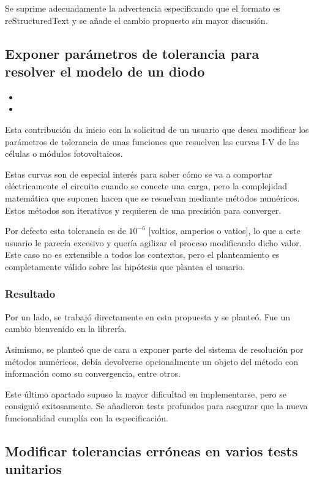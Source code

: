 Se suprime adecuadamente la advertencia especificando que el formato es reStructuredText y se añade el cambio propuesto sin mayor discusión.

\subsection{Exponer parámetros de tolerancia para resolver el modelo de un diodo}

\begin{itemize}
    \item {}
    \item {}
\end{itemize}

Esta contribución da inicio con la solicitud de un usuario que desea modificar los parámetros de tolerancia de unas funciones que resuelven las curvas I-V de las células o módulos fotovoltaicos.

Estas curvas son de especial interés para saber cómo se va a comportar eléctricamente el circuito cuando se conecte una carga, pero la complejidad matemática que suponen hacen que se resuelvan mediante métodos numéricos. Estos métodos son iterativos y requieren de una precisión para converger.

Por defecto esta tolerancia es de $10^{-6}$ [voltios, amperios o vatios], lo que a este usuario le parecía excesivo y quería agilizar el proceso modificando dicho valor. Este caso no es extensible a todos los contextos, pero el planteamiento es completamente válido sobre las hipótesis que plantea el usuario.

\subsubsection{Resultado}

Por un lado, se trabajó directamente en esta propuesta y se planteó. Fue un cambio bienvenido en la librería.

Asimismo, se planteó que de cara a exponer parte del sistema de resolución por métodos numéricos, debía devolverse opcionalmente un objeto del método con información como su convergencia, entre otros.

Este último apartado supuso la mayor dificultad en implementarse, pero se consiguió exitosamente. Se añadieron tests profundos para asegurar que la nueva funcionalidad cumplía con la especificación.

\subsection{Modificar tolerancias erróneas en varios tests unitarios}

